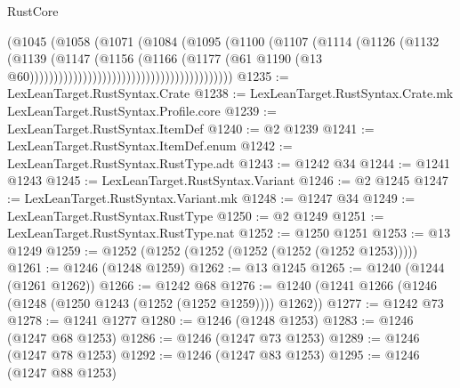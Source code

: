 \begin{lexlean}{RustCore}
\begin{coremodule}
                                                      (@1045
                                                        (@1058
                                                          (@1071
                                                            (@1084
                                                              (@1095
                                                                (@1100
                                                                  (@1107
                                                                    (@1114
                                                                      (@1126
                                                                        (@1132
                                                                          (@1139
                                                                            (@1147
                                                                              (@1156
                                                                                (@1166
                                                                                  (@1177
                                                                                    (@61
                                                                                      @1190
                                                                                      (@13
                                                                                        @60))))))))))))))))))))))))))))))))))))))))))
@1235 := LexLeanTarget.RustSyntax.Crate
@1238 := LexLeanTarget.RustSyntax.Crate.mk LexLeanTarget.RustSyntax.Profile.core
@1239 := LexLeanTarget.RustSyntax.ItemDef
@1240 := @2 @1239
@1241 := LexLeanTarget.RustSyntax.ItemDef.enum
@1242 := LexLeanTarget.RustSyntax.RustType.adt
@1243 := @1242 @34
@1244 := @1241 @1243
@1245 := LexLeanTarget.RustSyntax.Variant
@1246 := @2 @1245
@1247 := LexLeanTarget.RustSyntax.Variant.mk
@1248 := @1247 @34
@1249 := LexLeanTarget.RustSyntax.RustType
@1250 := @2 @1249
@1251 := LexLeanTarget.RustSyntax.RustType.nat
@1252 := @1250 @1251
@1253 := @13 @1249
@1259 := @1252 (@1252 (@1252 (@1252 (@1252 (@1252 @1253)))))
@1261 := @1246 (@1248 @1259)
@1262 := @13 @1245
@1265 := @1240 (@1244 (@1261 @1262))
@1266 := @1242 @68
@1276 := @1240 (@1241 @1266 (@1246 (@1248 (@1250 @1243 (@1252 (@1252 @1259)))) @1262))
@1277 := @1242 @73
@1278 := @1241 @1277
@1280 := @1246 (@1248 @1253)
@1283 := @1246 (@1247 @68 @1253)
@1286 := @1246 (@1247 @73 @1253)
@1289 := @1246 (@1247 @78 @1253)
@1292 := @1246 (@1247 @83 @1253)
@1295 := @1246 (@1247 @88 @1253)

\end{coremodule}
\end{lexlean}
